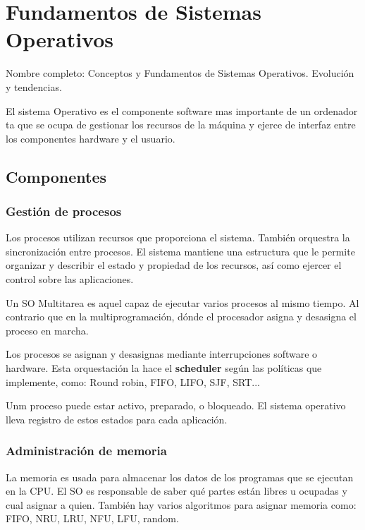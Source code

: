 \setcounter{section}{58} %
\section{Fundamentos de Sistemas Operativos}

Nombre completo: Conceptos y Fundamentos de Sistemas Operativos. Evolución y tendencias.

\localtableofcontents

El sistema Operativo es el componente software mas importante de un ordenador ta que se ocupa de gestionar los recursos de la máquina y ejerce de interfaz entre los componentes hardware y el usuario.

\subsection{Componentes}

\subsubsection{Gestión de procesos}
Los procesos utilizan recursos que proporciona el sistema. También orquestra la sincronización entre procesos. El sistema mantiene una estructura que le permite organizar y describir el estado y propiedad de los recursos, así como ejercer el control sobre las aplicaciones. 

Un SO Multitarea es aquel capaz de ejecutar varios procesos al mismo tiempo. Al contrario que en la multiprogramación, dónde el procesador asigna y desasigna el proceso en marcha.

Los procesos se asignan y desasignas mediante interrupciones software o hardware. Esta orquestación la hace el \textbf{scheduler} según las políticas que implemente, como: Round robin, FIFO, LIFO, SJF, SRT...

Unm proceso puede estar activo, preparado, o bloqueado. El sistema operativo lleva registro de estos estados para cada aplicación. 

\subsubsection{Administración de memoria}

La memoria es usada para almacenar los datos de los programas que se ejecutan en la CPU. El SO es responsable de saber qué partes están libres u ocupadas y cual asignar a quien. También hay varios algoritmos para asignar memoria como: FIFO, NRU, LRU, NFU, LFU, random.

